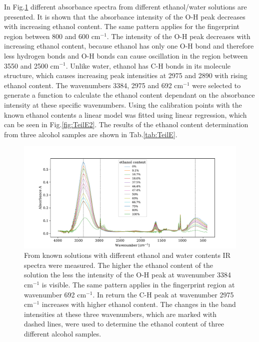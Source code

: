 \documentclass[a4paper,abstracton]{article}	                       %
\renewcommand{\cite}{\supercite}						%
\begin{document}
In Fig.\ref{fig:TeilE1} different absorbance spectra from different ethanol/water solutions are presented. It is shown that the absorbance intensity of the O-H peak decreases with increasing ethanol content. The same pattern applies for the fingerprint region between 800 and 600 cm$^{-1}$. The intensity of the O-H peak decreases with increasing ethanol content, because ethanol has only one O-H bond and therefore less hydrogen bonds and O-H bonds can cause oscillation in the region between 3550 and 2500 cm$^{-1}$\cite{assignment}. Unlike water, ethanol has C-H bonds in its molecule structure, which causes increasing peak intensities at 2975 and 2890 with rising ethanol content. The wavenumbers 3384, 2975 and 692 cm$^{-1}$ were selected to generate a function to calculate the ethanol content dependant on the absorbance intensity at these specific wavenumbers. Using the calibration points with the known ethanol contents a linear model was fitted using linear regression, which can be seen in Fig.\ref{fig:TeilE2}. The results of the ethanol content determination from three alcohol samples are shown in Tab.\ref{tab:TeilE}.

\begin{figure}[H]
\centering
 \includegraphics[width=1\textwidth] {TeilE1.pdf}
\caption{\label{fig:TeilE1}From known solutions with different ethanol and water contents IR spectra were measured. The higher the ethanol content of the solution the less the intensity of the O-H peak at wavenumber 3384 cm$^{-1}$ is visible. The same pattern applies in the fingerprint region at wavenumber 692 cm$^{-1}$. In return the C-H peak at wavenumber 2975 cm$^{-1}$ increases with higher ethanol content. The changes in the band intensities at these three wavenumbers, which are marked with dashed lines, were used to determine the ethanol content of three different alcohol samples.}
\end{figure}
\end{document}
